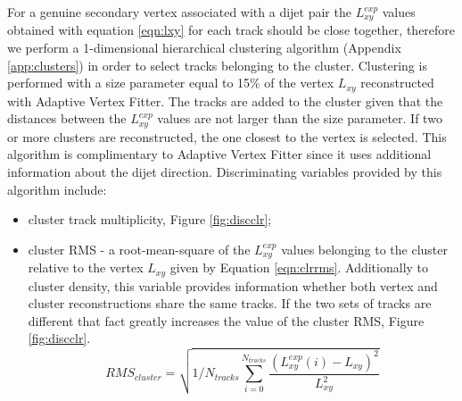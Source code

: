 \begin{enumerate}
For a genuine secondary vertex associated with a dijet pair the $L_{xy}^{exp}$ values obtained with equation
\ref{eqn:lxy} for each track should be close
 together, therefore we perform a 1-dimensional hierarchical clustering algorithm (Appendix 
\ref{app:clusters})
in order to select tracks belonging to the cluster. 
Clustering is performed with a size parameter equal to 15\% of 
the vertex $L_{xy}$ reconstructed with Adaptive Vertex Fitter. 
The tracks are added to the cluster given that the distances between the $L_{xy}^{exp}$
values are not larger than the size parameter. 
 If two or more clusters 
are reconstructed, the one closest to the vertex is selected. 
This algorithm is complimentary to Adaptive Vertex Fitter
since it uses additional information about the dijet direction. Discriminating variables provided
 by this algorithm include:
\begin{itemize}
\item cluster track multiplicity, Figure \ref{fig:discclr};
\item cluster RMS - a root-mean-square of the $L_{xy}^{exp}$ values belonging to the cluster
 relative to the vertex $L_{xy}$ given by Equation \ref{eqn:clrrms}. Additionally to cluster density, this
variable provides information whether both vertex and cluster reconstructions share the same tracks.
 If the two sets of tracks
are different that fact greatly increases the value of the cluster RMS, Figure \ref{fig:discclr}.
\begin{equation}
RMS_{cluster} = \sqrt{1/N_{tracks}\sum_{i=0}^{N_{tracks}}\frac{ (L_{xy}^{exp}(i) - L_{xy})^2}{L_{xy}^2}}
\label{eqn:clrrms}
\end{equation}
\end{itemize}


\end{enumerate}
